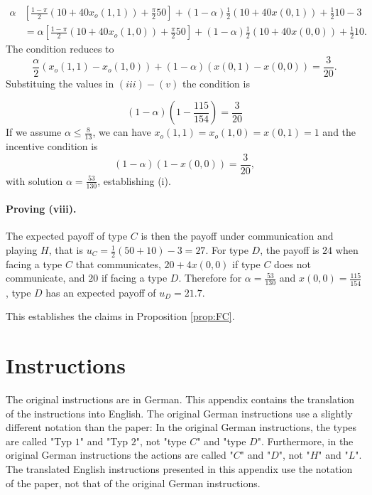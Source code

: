 \documentclass[12pt]{article}
\theoremstyle{break}
\begin{document}
\begin{align*}
	\alpha&\left[\frac{1-\pi}{2}(10+40 x_o(1,1))+\frac{\pi}{2}50\right]+(1-\alpha)\frac{1}{2}(10+40x(0,1))+\frac{1}{2}10-3\\
		&=\alpha\left[\frac{1-\pi}{2}(10+40 x_o(1,0))+\frac{\pi}{2}50\right]+(1-\alpha)\frac{1}{2}(10+40x(0,0))+\frac{1}{2}10.
\end{align*}
The condition reduces to 
\begin{equation}\label{IC-comm}
	\frac{\alpha}{2} (x_o(1,1)-x_o(1,0))+(1-\alpha) (x(0,1)-x(0,0))=\frac{3}{20}.	
\end{equation}
%
Substituing the values in $(iii)-(v)$ the condition is 

%
\[
(1-\alpha)\left(1-\frac{115}{154}\right)=\frac{3}{20}
\]
%
If we assume $\alpha\leq \frac{8}{13}$, we can have $x_o(1,1)=x_o(1,0)=x(0,1)=1$ and the incentive condition is 
\[
(1-\alpha) (1-x(0,0))=\frac{3}{20},
\]
with solution $\alpha=\frac{53}{130}$, establishing (i).

\paragraph{Proving (viii).} The expected payoff of type $C$ is then the payoff under communication and playing $H$, that is $u_C=\frac{1}{2}(50+10)-3=27$. For type $D$, the payoff is $24$ when facing a type $C$ that communicates, $20+4x(0,0)$ if type $C$ does not communicate, and $20$ if facing a type $D$. Therefore for $\alpha=\frac{53}{130}$ and $x(0,0)=\frac{115}{154}$, type $D$ has an expected payoff of $u_D=21.7$.
%


This establishes the claims in Proposition \ref{prop:FC}.

%   
%    
\newpage
\section{Instructions}

The original instructions are in German. This appendix contains the translation of the instructions into English. The original German instructions use a slightly different notation than the paper: In the original German instructions, the types are called "Typ $1$" and "Typ $2$", not "type $C$" and "type $D$". Furthermore, in the original German instructions the actions are called "$C$" and "$D$", not "$H$" and "$L$". The translated English instructions presented in this appendix use the notation of the paper, not that of the original German instructions.
\end{document}
